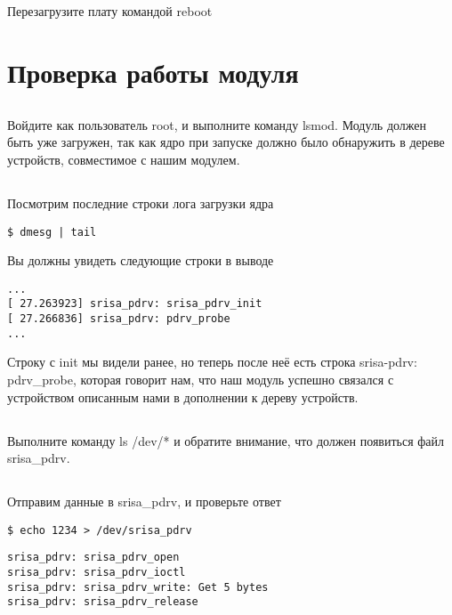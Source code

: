 \subsection{}Перезагрузите плату командой reboot

\section{Проверка работы модуля}

\subsection{}Войдите как пользователь root, и выполните команду lsmod.
Модуль должен быть уже загружен, так как ядро при запуске должно было обнаружить в дереве устройств, совместимое с нашим модулем. 

\subsection{}Посмотрим последние строки лога загрузки ядра
\begin{lstlisting}[style=bash]
$ dmesg | tail
\end{lstlisting}
Вы должны увидеть следующие строки в выводе
\begin{lstlisting}[style=stdout]
...
[ 27.263923] srisa_pdrv: srisa_pdrv_init
[ 27.266836] srisa_pdrv: pdrv_probe
...
\end{lstlisting}

Строку с init мы видели ранее, но теперь после неё есть строка srisa-pdrv: pdrv\_probe, которая говорит нам, что наш модуль успешно связался с устройством описанным нами в дополнении к дереву устройств.

\subsection{}Выполните команду ls /dev/* и обратите внимание, что должен появиться файл srisa\_pdrv.

\subsection{}Отправим данные в srisa\_pdrv, и проверьте ответ
\begin{lstlisting}[style=bash]
$ echo 1234 > /dev/srisa_pdrv
\end{lstlisting}
\begin{lstlisting}[style=stdout]
srisa_pdrv: srisa_pdrv_open
srisa_pdrv: srisa_pdrv_ioctl
srisa_pdrv: srisa_pdrv_write: Get 5 bytes
srisa_pdrv: srisa_pdrv_release
\end{lstlisting} 

